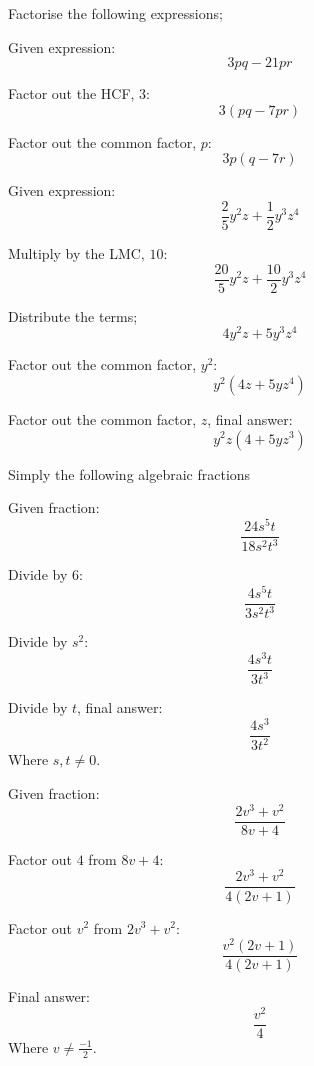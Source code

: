 \documentclass[a4paper]{tufte-handout}
\begin{document}
\begin{question}

\qpart
Factorise the following expressions;

\qsubpart
Given expression:
	\[3pq -21pr\]
	
\bigskip	
	
Factor out the HCF, $3$:
	\[3(pq -7pr)\]
	
\bigskip	
	
Factor out the common factor, $p$:
	\[3p(q -7r)\]
	
\pagebreak
	
\qsubpart
Given expression:
	\[\frac{2}{5}y^2z + \frac{1}{2}y^3z^4\]
	
\bigskip	
	
Multiply by the LMC, $10$:
	\[\frac{20}{5}y^2z + \frac{10}{2}y^3z^4\]

\bigskip
	
Distribute the terms;
	\[4y^2z +5y^3z^4\]
	
\bigskip	
	
Factor out the common factor, $y^2$:
	\[y^2(4z + 5yz^4)\]
	
\bigskip	
	
Factor out the common factor, $z$, final answer:
	\[y^2z(4 +5yz^3)\]

\vspace{1.5cm}
	
\qpart
Simply the following algebraic fractions

\qsubpart
Given fraction:
	\[\frac{24s^5t}{18s^2t^3}\]
	
\bigskip
	
Divide by $6$:
	\[\frac{4s^5t}{3s^2t^3}\]
	
\bigskip	
	
Divide by $s^2$:
	\[\frac{4s^3t}{3t^3}\] 
	
\bigskip
	
Divide by $t$, final answer:
	\[\frac{4s^3}{3t^2}\]
\hfill Where $s, t \neq 0$.

\pagebreak

\qsubpart
Given fraction:
	\[\frac{2v^3+v^2}{8v+4}\]
	
\bigskip
	
Factor out $4$ from $8v+4$:
	\[\frac{2v^3+v^2}{4(2v+1)}\]
	
\bigskip	
	
Factor out $v^2$ from $2v^3+v^2$:
	\[\frac{v^2(2v+1)}{4(2v+1)}\]
	
\bigskip	
	
Final answer:
	\[\frac{v^2}{4}\]
\hfill Where $v \neq\frac{-1}{2}$.


\end{question}
\end{document}
